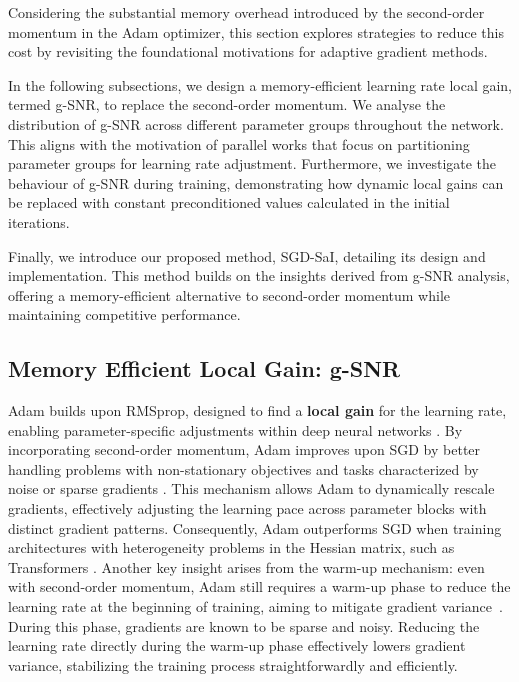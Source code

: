Considering the substantial memory overhead introduced by the second-order momentum in the Adam optimizer, this section explores strategies to reduce this cost by revisiting the foundational motivations for adaptive gradient methods.

In the following subsections, we design a memory-efficient learning rate local gain, termed g-SNR, to replace the second-order momentum. We analyse the distribution of g-SNR across different parameter groups throughout the network. This aligns with the motivation of parallel works \cite{zhang2024adamminiusefewerlearning} that focus on partitioning parameter groups for learning rate adjustment. Furthermore, we investigate the behaviour of g-SNR during training, demonstrating how dynamic local gains can be replaced with constant preconditioned values calculated in the initial iterations.

Finally, we introduce our proposed method, SGD-SaI, detailing its design and implementation. This method builds on the insights derived from g-SNR analysis, offering a memory-efficient alternative to second-order momentum while maintaining competitive performance.

\subsection{Memory Efficient Local Gain: g-SNR}
Adam builds upon RMSprop, designed to find a \textbf{local gain} for the learning rate, enabling parameter-specific adjustments within deep neural networks \cite{hinton2012neural, kingma2014adam}. By incorporating second-order momentum, Adam improves upon SGD by better handling problems with non-stationary objectives and tasks characterized by noise or sparse gradients \cite{kingma2014adam}. This mechanism allows Adam to dynamically rescale gradients, effectively adjusting the learning pace across parameter blocks with distinct gradient patterns. Consequently, Adam outperforms SGD when training architectures with heterogeneity problems in the Hessian matrix, such as Transformers \cite{zhang2024transformers, zhang2024adamminiusefewerlearning}. Another key insight arises from the warm-up mechanism: even with second-order momentum, Adam still requires a warm-up phase to reduce the learning rate at the beginning of training, aiming to mitigate gradient variance~\cite{liu2021variance}. During this phase, gradients are known to be sparse and noisy. Reducing the learning rate directly during the warm-up phase effectively lowers gradient variance, stabilizing the training process straightforwardly and efficiently.

